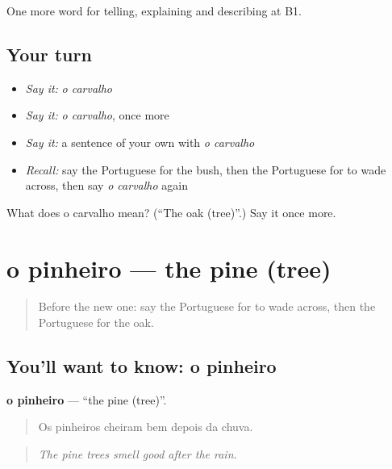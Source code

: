 \begin{grammarlens}[title={What you've built}]
One more word for telling, explaining and describing at B1.
\end{grammarlens}

\subsection*{Your turn}
\begin{itemize}
\raggedright
  \item \emph{Say it:} \emph{o carvalho}
  \item \emph{Say it:} \emph{o carvalho}, once more
  \item \emph{Say it:} a sentence of your own with \emph{o carvalho}
  \item \emph{Recall:} say the Portuguese for the bush, then the Portuguese for to wade across, then say \emph{o carvalho} again
\end{itemize}

\begin{tcolorbox}[breakable,colback=teal!4,colframe=teal!35!black,title={Before you move on}]
What does o carvalho mean? (\textquotedblleft{}The oak (tree)\textquotedblright{}.) Say it once more.
\end{tcolorbox}
\section[o pinheiro]{o pinheiro — the pine (tree)}

\label{lesson:PT-C457-pinheiro}



\begin{quote}
Before the new one: say the Portuguese for to wade across, then the Portuguese for the oak.
\end{quote}

\subsection*{You'll want to know: o pinheiro}
\textbf{o pinheiro} — \textquotedblleft{}the pine (tree)\textquotedblright{}.

\begin{quote}
Os pinheiros cheiram bem depois da chuva.
\end{quote}

\begin{quote}
\emph{The pine trees smell good after the rain.}
\end{quote}

